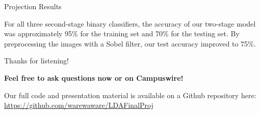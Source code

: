 \documentclass[9pt]{beamer}
\begin{document}
\begin{frame}{Projection Results}
    \begin{figure}[h]%
    \centering
    \qquad
    \qquad
    \end{figure}
For all three second-stage binary classifiers, the accuracy of our two-stage model was approximately 95\% for the training set and 70\% for the testing set. By preprocessing the images with a Sobel filter, our test accuracy improved to 75\%.
\end{frame}
\begin{frame}{Thanks for listening!}
    \begin{center}
        \textbf{Feel free to ask questions now or on Campuswire!}
        
        Our full code and presentation material is available on a Github repository here: \url{https://github.com/warewaware/LDAFinalProj}
    \end{center}
\end{frame}
\end{document}
